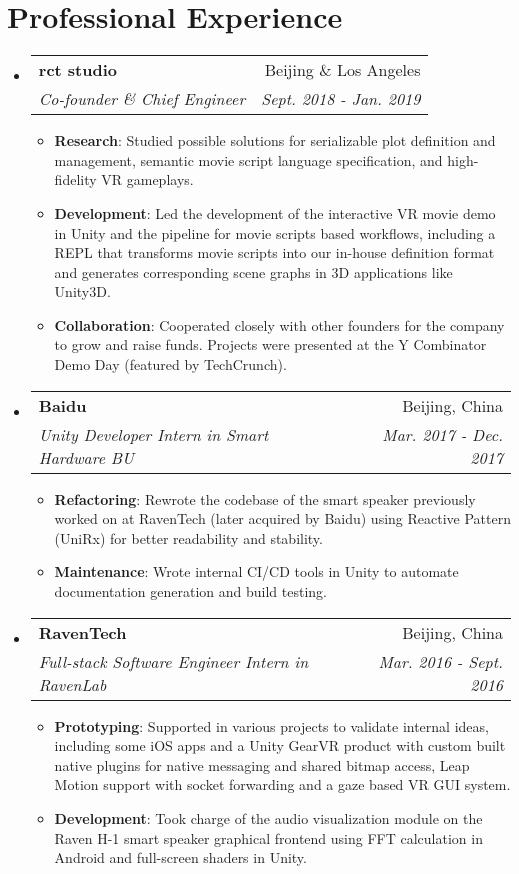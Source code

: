\documentclass[letterpaper,11pt]{article}
\makeatletter
\newcommand{\resumeItem}[2]{
  \item\small{
    \textbf{#1}{: #2 \vspace{-2pt}}
  }
}
\newcommand{\resumeSubheading}[4]{
  \vspace{-1pt}\item
    \begin{tabular*}{0.97\textwidth}[t]{l@{\extracolsep{\fill}}r}
      \textbf{#1} & #2 \\
      \textit{\small#3} & \textit{\small #4} \\
    \end{tabular*}\vspace{-5pt}
}
\newcommand{\resumeSubHeadingListStart}{\begin{itemize}[leftmargin=*]}
\newcommand{\resumeSubHeadingListEnd}{\end{itemize}}
\newcommand{\resumeItemListStart}{\begin{itemize}}
\newcommand{\resumeItemListEnd}{\end{itemize}\vspace{-5pt}}
\makeatother
\begin{document}
\section{Professional Experience}
  \resumeSubHeadingListStart
      
    \resumeSubheading
      {rct studio}{Beijing \& Los Angeles}
      {Co-founder \& Chief Engineer}{Sept. 2018 - Jan. 2019}
      \resumeItemListStart
        \resumeItem{Research}
          {Studied possible solutions for serializable plot definition and management, semantic movie script language specification, and high-fidelity VR gameplays.}
		\resumeItem{Development}
          {Led the development of the interactive VR movie demo in Unity and the pipeline for movie scripts based workflows, including a REPL that transforms movie scripts into our in-house definition format and generates corresponding scene graphs in 3D applications like Unity3D.}
        \resumeItem{Collaboration}
          {Cooperated closely with other founders for the company to grow and raise funds. Projects were presented at the Y Combinator Demo Day (featured by TechCrunch).}
      \resumeItemListEnd
      
    \resumeSubheading
      {Baidu}{Beijing, China}
      {Unity Developer Intern in Smart Hardware BU}{Mar. 2017 - Dec. 2017}
      \resumeItemListStart
        \resumeItem{Refactoring}
          {Rewrote the codebase of the smart speaker previously worked on at RavenTech (later acquired by Baidu) using Reactive Pattern (UniRx) for better readability and stability.}
		\resumeItem{Maintenance}
          {Wrote internal CI/CD tools in Unity to automate documentation generation and build testing.}
      \resumeItemListEnd

	\resumeSubheading
      {RavenTech}{Beijing, China}
      {Full-stack Software Engineer Intern in RavenLab}{Mar. 2016 - Sept. 2016}
      \resumeItemListStart
        \resumeItem{Prototyping}
          {Supported in various projects to validate internal ideas, including some iOS apps and a Unity GearVR product with custom built native plugins for native messaging and shared bitmap access, Leap Motion support with socket forwarding and a gaze based VR GUI system. }
        \resumeItem{Development}
          {Took charge of the audio visualization module on the Raven H-1 smart speaker graphical frontend using FFT calculation in Android and full-screen shaders in Unity.}
      \resumeItemListEnd

  \resumeSubHeadingListEnd
\end{document}
